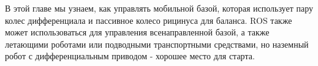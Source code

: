 

В этой главе мы узнаем, как управлять мобильной базой, которая использует пару колес дифференциала и пассивное колесо рицинуса для баланса. ROS также может использоваться для управления всенаправленной базой, а также летающими роботами или подводными транспортными средствами, но наземный робот с дифференциальным приводом - хорошее место для старта.


